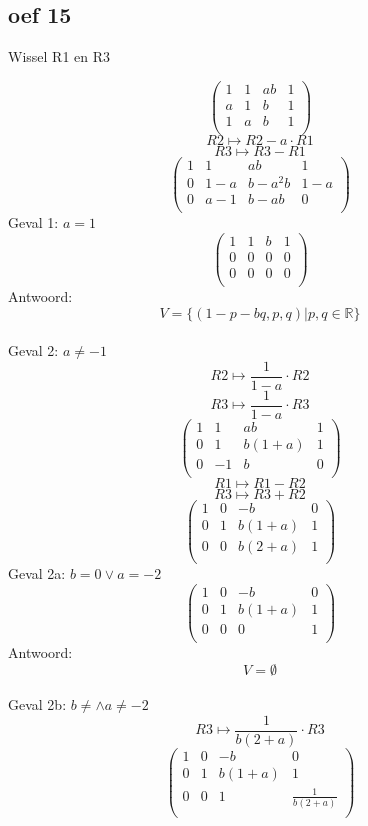 \documentclass[10pt,a4paper]{article}
\begin{document}
\subsection*{oef 15}
\begin{center}
Wissel R1 en R3
\end{center}
\[
\begin{pmatrix}
1 & 1 & ab & 1\\
a & 1 & b & 1\\
1 & a & b & 1\\
\end{pmatrix}
\]
\[ R2 \longmapsto R2 - a\cdot R1 \]
\[ R3 \longmapsto R3 - R1 \]
\[
\begin{pmatrix}
1 & 1 & ab & 1\\
0 & 1-a & b-a^2b & 1-a\\
0 & a-1 & b-ab & 0\\
\end{pmatrix}
\]
Geval 1: $a=1$
\[
\begin{pmatrix}
1 & 1 & b & 1\\
0 & 0 & 0 & 0\\
0 & 0 & 0 & 0\\
\end{pmatrix}
\]
Antwoord:
\[
V = \{ (1-p-bq,p,q) | p,q \in \mathbb{R} \}
\]\\
Geval 2: $a \neq -1$
\[ R2 \longmapsto \frac{1}{1-a}\cdot R2 \]
\[ R3 \longmapsto \frac{1}{1-a}\cdot R3 \]
\[
\begin{pmatrix}
1 & 1 & ab & 1\\
0 & 1 & b(1+a) & 1\\
0 & -1 & b & 0\\
\end{pmatrix}
\]
\[ R1 \longmapsto R1 - R2 \]
\[ R3 \longmapsto R3 + R2 \]
\[
\begin{pmatrix}
1 & 0 & -b & 0\\
0 & 1 & b(1+a) & 1\\
0 & 0 & b(2+a) & 1\\
\end{pmatrix}
\]
Geval 2a: $b=0 \vee a=-2$
\[
\begin{pmatrix}
1 & 0 & -b & 0\\
0 & 1 & b(1+a) & 1\\
0 & 0 & 0 & 1\\
\end{pmatrix}
\]
Antwoord:
\[
V=\emptyset
\]\\
Geval 2b: $b\neq \wedge a \neq -2$
\[ R3 \longmapsto \frac{1}{b(2+a)}\cdot R3 \]
\[
\begin{pmatrix}
1 & 0 & -b & 0\\
0 & 1 & b(1+a) & 1\\
0 & 0 & 1 & \frac{1}{b(2+a)}\\
\end{pmatrix}
\]
\end{document}
